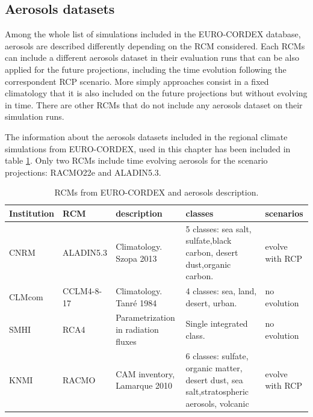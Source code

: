 

\subsection{Aerosols datasets}

Among the whole list of simulations included in the EURO-CORDEX database, aerosols are described differently depending on the RCM considered. Each RCMs can include a different aerosols dataset in their evaluation runs that can be also applied for the future projections, including the time evolution following the correspondent RCP scenario. More simply approaches consist in a fixed climatology that it is also included on the future projections but without evolving in time. There are other RCMs that do not include any aerosols dataset on their simulation runs.

The information about the aerosols datasets included in the regional climate simulations from EURO-CORDEX, used in this chapter has been included in table \ref{tb:aero}. Only two RCMs include time evolving aerosols for the scenario projections: RACMO22e and ALADIN5.3. %


\begin{table}[h!]
\caption{\label{tb:aero}RCMs from EURO-CORDEX and aerosols description.}
\footnotesize
\begin{tabular}{>{\raggedrigth}m{1.3cm}>{\raggedright}m{1.5cm}|>{\raggedright}m{2.2cm}>{\raggedright}m{2.2cm}>{\raggedright}m{2cm}}
\toprule 
Institution  & RCM & description & classes & scenarios \tabularnewline
\midrule
CNRM & ALADIN5.3 & Climatology. Szopa 2013 & 5 classes: sea salt, sulfate,black carbon, desert dust,organic carbon.& evolve with RCP \tabularnewline
CLMcom&CCLM4-8-17& Climatology. Tanré 1984 & 4 classes: sea, land, desert, urban.& no evolution\tabularnewline 
SMHI&RCA4& Parametrization in radiation fluxes & Single integrated class.& no evolution \tabularnewline
KNMI&RACMO&CAM inventory, Lamarque 2010 & 6 classes: sulfate, organic matter, desert dust, sea salt,stratospheric aerosols, volcanic & evolve with RCP\tabularnewline
\bottomrule
\end{tabular}\\
\end{table}
\normalsize

